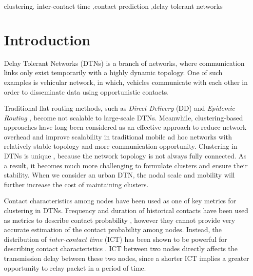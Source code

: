 \documentclass[conference]{IEEEtran}
\begin{document}
\begin{IEEEkeywords}
clustering,  inter-contact time ,contact prediction ,delay tolerant networks
\end{IEEEkeywords}




%
\IEEEpeerreviewmaketitle



\section{Introduction}
\label{INTRODUCTION}
Delay Tolerant Networks (DTNs) \cite{aFall-2,cAhmedSalil-4} is a branch of networks,
where communication links only exist temporarily with a highly dynamic topology. One of such examples is vehicular network, in which, vehicles communicate with each other in order to disseminate data using opportunistic contacts.

Traditional flat routing methods, such as \emph{Direct Delivery} (DD) \cite{eKleywegtNori-6} and \emph{Epidemic Routing} \cite{gVahdatBecker-8}, become not scalable to large-scale DTNs. Meanwhile, clustering-based approaches have long been considered as an effective approach to reduce network overhead and improve scalability in traditional mobile ad hoc networks \cite{hAgarwalMotwani-9,iLiuLiu-10,jWangMi-11,kWhitbeckConan-12} with relatively stable topology and more communication opportunity.
Clustering in DTNs is unique \cite{uHaHongyi-22,kernal2005survey}, because the network topology is not always fully connected. As a result, it becomes much more challenging to formulate clusters and ensure their stability. When we consider an urban DTN, the nodal scale and mobility will further increase the cost of maintaining clusters.

Contact characteristics among nodes \cite{nGaoCao-15,oWhitbeckConan-16,p20102413007279} have been used as one of key metrics for clustering in DTNs. Frequency and duration of historical contacts have been used as metrics to describe contact probability \cite{rLiHui-19,t20102413006168}, however they cannot provide very accurate estimation of the contact probability among nodes. Instead, the distribution of  \emph{inter-contact time} (ICT) has been shown to be powerful for describing contact characteristics \cite{rLiHui-19,qGroeneveltNain-18,s20104613388174}. ICT between two nodes directly affects the transmission delay between these two nodes, since a shorter ICT implies a greater opportunity to relay packet in a period of time.
\end{document}
